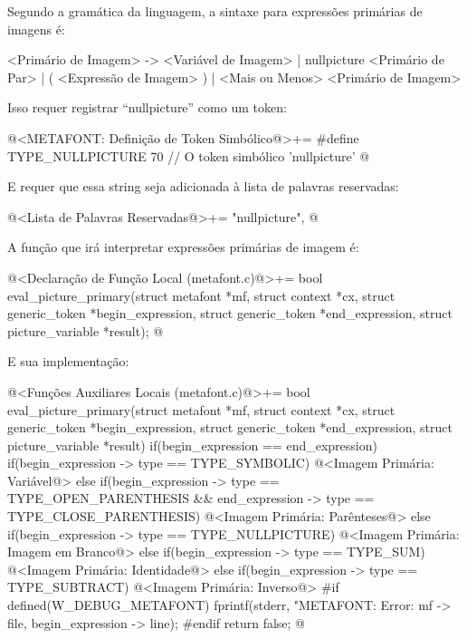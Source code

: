 {

Segundo a gramática da linguagem, a sintaxe para expressões primárias
de imagens é:

\alinhaverbatim
<Primário de Imagem> -> <Variável de Imagem> |
                        nullpicture <Primário de Par> |
                        ( <Expressão de Imagem> ) |
                        <Mais ou Menos> <Primário de Imagem>
\alinhanormal

Isso requer registrar ``nullpicture'' como um token:

\iniciocodigo
@<METAFONT: Definição de Token Simbólico@>+=
#define TYPE_NULLPICTURE        70 // O token simbólico 'nullpicture'
@
\fimcodigo

E requer que essa string seja adicionada à lista de palavras reservadas:

\iniciocodigo
@<Lista de Palavras Reservadas@>+=
"nullpicture",
@
\fimcodigo

A função que irá interpretar expressões primárias de imagem é:

\iniciocodigo
@<Declaração de Função Local (metafont.c)@>+=
bool eval_picture_primary(struct metafont *mf, struct context *cx,
                          struct generic_token *begin_expression,
                          struct generic_token *end_expression,
                          struct picture_variable *result);
@
\fimcodigo

E sua implementação:

\iniciocodigo
@<Funções Auxiliares Locais (metafont.c)@>+=
bool eval_picture_primary(struct metafont *mf, struct context *cx,
                         struct generic_token *begin_expression,
                         struct generic_token *end_expression,
                         struct picture_variable *result){
  if(begin_expression == end_expression){
    if(begin_expression -> type == TYPE_SYMBOLIC){
      @<Imagem Primária: Variável@>
    }
  }
  else{
    if(begin_expression -> type == TYPE_OPEN_PARENTHESIS &&
      end_expression -> type == TYPE_CLOSE_PARENTHESIS){
      @<Imagem Primária: Parênteses@>
    }
    else if(begin_expression -> type == TYPE_NULLPICTURE){
      @<Imagem Primária: Imagem em Branco@>
    }
    else if(begin_expression -> type == TYPE_SUM){
      @<Imagem Primária: Identidade@>
    }
    else if(begin_expression -> type == TYPE_SUBTRACT){
      @<Imagem Primária: Inverso@>
    }
  }
#if defined(W_DEBUG_METAFONT)
  fprintf(stderr, "METAFONT: Error: %
          mf -> file, begin_expression -> line);
#endif
  return false;
}
@
\fimcodigo

}
